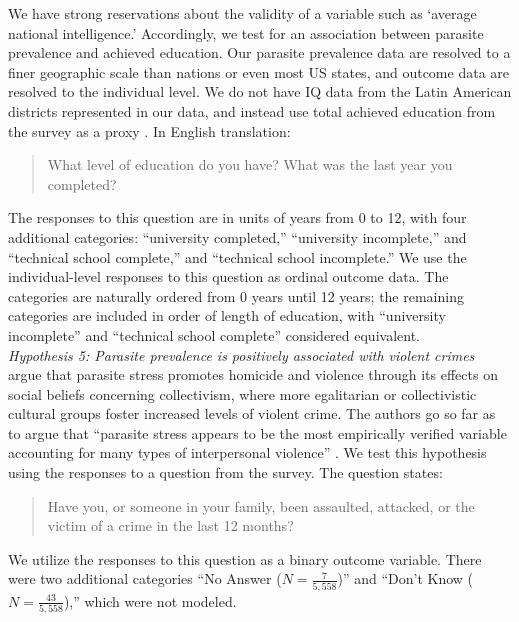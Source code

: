\documentclass[12pt]{article}
\begin{document}
We have strong reservations about the validity of a variable such as `average national intelligence.' Accordingly, we test for an association between parasite prevalence and achieved education.  Our parasite prevalence data are resolved to a finer geographic scale than nations or even most US states, and outcome data are resolved to the individual level.  We do not have IQ data from the Latin American districts represented in our data, and instead use total achieved education from the \citet{LB2008} survey as a proxy \citep[a published correlation estimate between achieved education and IQ is r=.63,][]{matarazzo1984relationship}.  In English translation:
\begin{quote}
\small
What level of education do you have? What was the last year you completed?
 \end{quote}
The responses to this question are in units of years from 0 to 12, with four additional categories: ``university completed,''  ``university incomplete,'' and ``technical school complete,'' and ``technical school incomplete.''  We use the individual-level responses to this question as ordinal outcome data. The categories are naturally ordered from 0 years until 12 years; the remaining categories are included in order of length of education, with ``university incomplete'' and ``technical school complete'' considered equivalent. \\

\noindent\textit{Hypothesis 5: Parasite prevalence is positively associated with violent crimes}\\

\citet{Thornhill2011} argue that parasite stress promotes homicide and violence through its effects on social beliefs concerning collectivism, where more egalitarian or collectivistic cultural groups foster increased levels of violent crime. The authors go so far as to argue that ``parasite stress appears to be the most empirically verified variable accounting for many types of interpersonal violence'' \citep[pg3474]{Thornhill2011}. We test this hypothesis using the responses to a question from the \citet{LB2008} survey. The question states:
\begin{quote}
\small
Have you, or someone in your family, been assaulted, attacked, or the victim of a crime in the last 12 months?
 \end{quote}
We utilize the responses to this question as a binary outcome variable. There were two additional categories ``No Answer ($N=\frac{7}{5,558}$)'' and ``Don't Know ($N=\frac{43}{5,558}$),'' which were not modeled.\\
\end{document}
